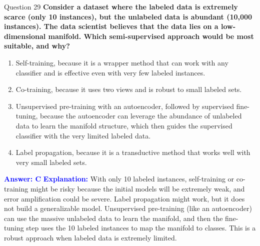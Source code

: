 \documentclass[8pt]{beamer}  %
\begin{document}
	\begin{frame}{Question 29}
		\textbf{Consider a dataset where the labeled data is extremely scarce (only 10 instances), but the unlabeled data is abundant (10,000 instances). The data scientist believes that the data lies on a low-dimensional manifold. Which semi-supervised approach would be most suitable, and why?}
		\begin{enumerate}
			\item Self-training, because it is a wrapper method that can work with any classifier and is effective even with very few labeled instances.
			\item Co-training, because it uses two views and is robust to small labeled sets.
			\item Unsupervised pre-training with an autoencoder, followed by supervised fine-tuning, because the autoencoder can leverage the abundance of unlabeled data to learn the manifold structure, which then guides the supervised classifier with the very limited labeled data.
			\item Label propagation, because it is a transductive method that works well with very small labeled sets.
		\end{enumerate}
		\vspace{0.2cm}
		\textcolor{blue}{\textbf{Answer: C}}
		\vspace{0.2cm}
		\textcolor{blue}{\textbf{Explanation:}} With only 10 labeled instances, self-training or co-training might be risky because the initial models will be extremely weak, and error amplification could be severe. Label propagation might work, but it does not build a generalizable model. Unsupervised pre-training (like an autoencoder) can use the massive unlabeled data to learn the manifold, and then the fine-tuning step uses the 10 labeled instances to map the manifold to classes. This is a robust approach when labeled data is extremely limited.
	\end{frame}
	
\end{document}

